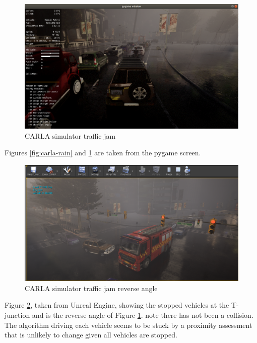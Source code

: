 \begin{figure}[h!]
\centering
\includegraphics[width=\textwidth]{Figures/carla-traffic-jam.png}
\caption{CARLA simulator traffic jam}
\label{fig:carla-traffic-jam}
\end{figure}

Figures \ref{fig:carla-rain} and \ref{fig:carla-traffic-jam} are taken from the pygame screen.

\begin{figure}[h!]
\centering
\includegraphics[width=\textwidth]{Figures/carla-traffic-jam-2.png}
\caption{CARLA simulator traffic jam reverse angle}
\label{fig:carla-traffic-jam-2}
\end{figure}

Figure \ref{fig:carla-traffic-jam-2}, taken from Unreal Engine, showing the stopped vehicles at the T-junction and is the reverse angle of Figure \ref{fig:carla-traffic-jam}. note there has not been a collision. The algorithm driving each vehicle seems to be stuck by a proximity assessment that is unlikely to change given all vehicles are stopped.

